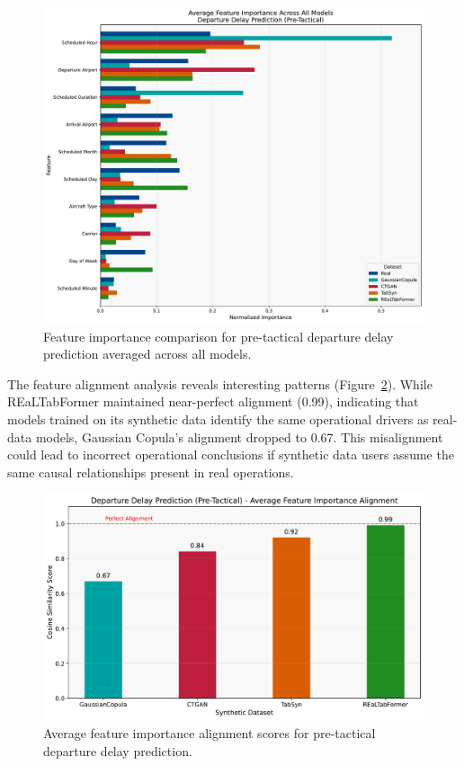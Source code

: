 \documentclass[conference]{IEEEtran}
\begin{document}
\begin{figure}[htbp]
    \centering
    \includegraphics[width=\linewidth]{plots/departure_delay_min_pre-tactical/feature_importances/departure_delay_min_pre-tactical_all_models_feature_comparison.pdf}
    \caption{Feature importance comparison for pre-tactical departure delay prediction averaged across all models.}
    \label{fig:departure_features}
\end{figure}

The feature alignment analysis reveals interesting patterns (Figure~\ref{fig:departure_alignment}). While REaLTabFormer maintained near-perfect alignment (0.99), indicating that models trained on its synthetic data identify the same operational drivers as real-data models, Gaussian Copula's alignment dropped to 0.67. This misalignment could lead to incorrect operational conclusions if synthetic data users assume the same causal relationships present in real operations.

\begin{figure}[htbp]
    \centering
    \includegraphics[width=0.8\linewidth]{plots/departure_delay_min_pre-tactical/departure_delay_min_pre-tactical_avg_alignment_score.pdf}
    \caption{Average feature importance alignment scores for pre-tactical departure delay prediction.}
    \label{fig:departure_alignment}
\end{figure}
\end{document}
